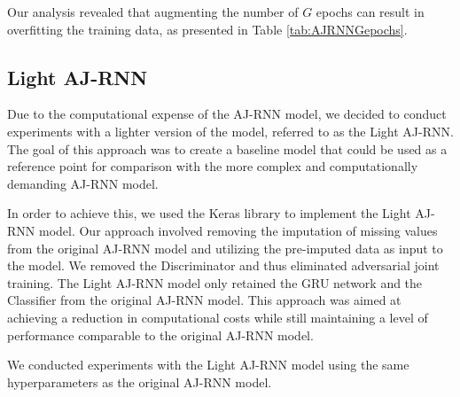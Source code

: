 Our analysis revealed that augmenting the number of $G$ epochs can result in overfitting the training data, as presented in Table \ref{tab:AJRNNGepochs}.


\subsection{Light AJ-RNN}

Due to the computational expense of the AJ-RNN model, we decided to conduct experiments with a lighter version of the model, referred to as the Light AJ-RNN.
The goal of this approach was to create a baseline model that could be used as a reference point for comparison with the more complex and computationally demanding AJ-RNN model. 

In order to achieve this, we used the Keras library to implement the Light AJ-RNN model.
Our approach involved removing the imputation of missing values from the original AJ-RNN model and utilizing the pre-imputed data as input to the model.
We removed the Discriminator and thus eliminated adversarial joint training.
The Light AJ-RNN model only retained the GRU network and the Classifier from the original AJ-RNN model.
This approach was aimed at achieving a reduction in computational costs while still maintaining a level of performance comparable to the original AJ-RNN model.

We conducted experiments with the Light AJ-RNN model using the same hyperparameters as the original AJ-RNN model.


